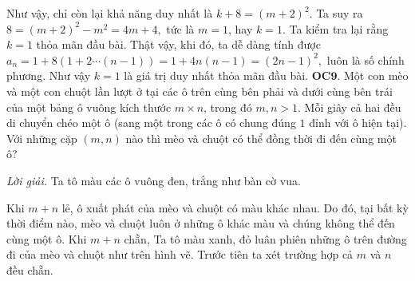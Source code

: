 \begin{multicols}{2}
	\vskip 0.1cm
	Như vậy, chỉ còn lại khả năng duy nhất là $k+8=(m+2)^2.$ Ta suy ra $8=(m+2)^2-m^2=4m+4,$ tức là $m=1$, hay $k=1.$
	\vskip 0.1cm
	Ta kiểm tra lại rằng $k=1$ thỏa mãn đầu bài. Thật vậy, khi đó, ta dễ dàng tính được
	$a_n=1+ 8(1+2\cdots (n-1))= 1+ 4n(n-1)=(2n-1)^2,$ luôn là số chính phương.   
	\vskip 0.1cm
	Như vậy $k=1$ là giá trị duy nhất thỏa mãn đầu bài.
	\vskip 0.1cm
	{\bf\color{cackithi} OC$\pmb{9.}$} Một con mèo và một con chuột lần lượt ở tại các ô trên cùng bên phải và dưới cùng bên trái của một bảng ô vuông kích thước $m\times n$, trong đó $m, n > 1.$ Mỗi giây cả hai đều di chuyển
	chéo một ô (sang một trong các ô có chung đúng $1$ đỉnh với ô hiện tại).
	\vskip 0.1cm
	Với những cặp $(m, n)$ nào thì mèo và chuột có thể đồng thời đi đến cùng một ô?
	\begin{center}
	\end{center}
	\textit{Lời giải.} Ta tô màu các ô vuông đen, trắng như bàn cờ vua.    
	\begin{figure}[H]
		\vspace*{-5pt}
		\centering
		\captionsetup{labelformat= empty, justification=centering}
		\vspace*{-5pt}
	\end{figure}
	Khi $m+n$ lẻ, ô xuất phát của mèo và chuột có màu khác nhau.  Do đó, tại bất kỳ thời điểm nào, mèo và chuột luôn ở những ô khác màu và chúng không thể đến cùng một ô.  
	\vskip 0.1cm
	Khi $m+n$ chẵn, Ta tô màu xanh, đỏ luân phiên những ô trên đường đi của mèo và chuột như trên hình vẽ. 
	\vskip 0.1cm
	Trước tiên ta xét trường hợp cả $m$ và $n$ đều chẵn. 

\end{multicols}
